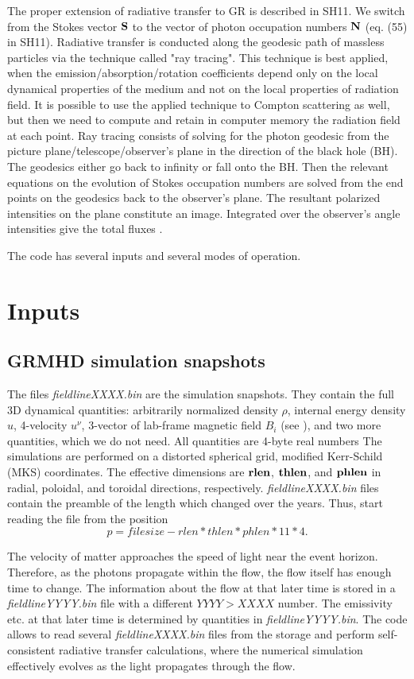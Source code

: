 \documentclass{emulateapj}
\begin{document}
The proper extension of radiative transfer to GR is described in SH11. We switch from the Stokes vector ${\bf S}$ to the vector of photon occupation numbers ${\bf N}$ (eq. (55) in SH11).
Radiative transfer is conducted along the geodesic path of massless particles via the technique called "ray tracing". This technique is best applied, when the emission/absorption/rotation coefficients depend only on the local dynamical properties of the medium and not on the local properties of radiation field. It is possible to use the applied technique to Compton scattering as well, but then we need to compute and retain in computer memory the radiation field at each point. Ray tracing consists of solving for the photon geodesic from the picture plane/telescope/observer's plane in the direction of the black hole (BH). The geodesics either go back to infinity or fall onto the BH. Then the relevant equations on the evolution of Stokes occupation numbers are solved from the end points on the geodesics back to the observer's plane. The resultant polarized intensities on the plane constitute an image. Integrated over the observer's angle intensities give the total fluxes \citep{Rybicki1979}.

The code has several inputs and several modes of operation.
\section{Inputs}
\subsection{GRMHD simulation snapshots}
The files \textit{fieldlineXXXX.bin} are the simulation snapshots. They contain the full 3D dynamical quantities: arbitrarily normalized density $\rho$, internal energy density $u$,
4-velocity $u^\nu$, 3-vector of lab-frame magnetic field $B_i$ (see \citealt{Penna:2010dj}), and two more quantities, which we do not need. All quantities are 4-byte real numbers
The simulations are performed on a distorted spherical grid, modified Kerr-Schild (MKS) coordinates. The effective dimensions are ${\bf rlen}$, ${\bf thlen}$, and ${\bf phlen}$ in radial, poloidal, and toroidal directions, respectively. \textit{fieldlineXXXX.bin} files contain the preamble of the length which changed over the years. Thus, start reading the file from the position
\begin{equation}
p=filesize-rlen*thlen*phlen*11*4.
\end{equation}

The velocity of matter approaches the speed of light near the event horizon. Therefore, as the photons propagate within the flow, the flow itself has enough time to change.
The information about the flow at that later time is stored in a \textit{fieldlineYYYY.bin} file with a different $YYYY>XXXX$ number. The emissivity etc. at that later time is determined by quantities in \textit{fieldlineYYYY.bin}. The code allows to read several \textit{fieldlineXXXX.bin} files from the storage and perform self-consistent radiative transfer calculations, where the numerical simulation effectively evolves as the light propagates through the flow.
\end{document}
